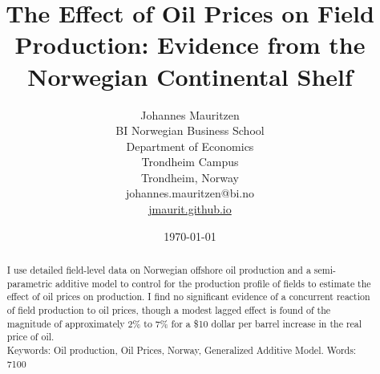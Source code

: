 \documentclass[12pt]{article}
\title{The Effect of Oil Prices on Field Production: Evidence from the Norwegian Continental Shelf}
\author{Johannes Mauritzen\\
        BI Norwegian Business School\\
        Department of Economics\\
        Trondheim Campus \\
        Trondheim, Norway\\
        johannes.mauritzen@bi.no\\
        \url{jmaurit.github.io}\\
		}
\date{\today}
\begin{document}
	\maketitle

\begin{abstract}
I use detailed field-level data on Norwegian offshore oil production and a semi-parametric additive model to control for the production profile of fields to estimate the effect of oil prices on production. I find no significant evidence of a concurrent reaction of field production to oil prices, though a modest lagged effect is found of the magnitude of approximately 2\% to 7\% for a \$10 dollar per barrel increase in the real price of oil.\\
Keywords: Oil production, Oil Prices, Norway, Generalized Additive Model.
Words: 7100
\end{abstract}
\end{document}
